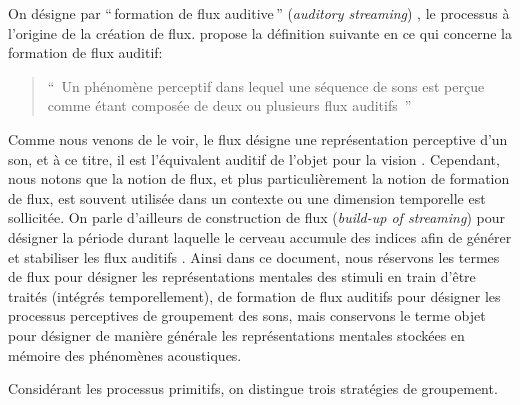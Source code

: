 On désigne par ``\,formation de flux auditive\,'' (\emph{auditory streaming}) , le processus à l'origine de la création de flux. \citep{winkler2009modeling} propose la définition suivante en ce qui concerne la formation de flux auditif:

\begin{quote}
``\, Un phénomène perceptif dans lequel une séquence de sons est perçue comme étant composée de deux ou plusieurs flux auditifs \,''
\end{quote}

Comme nous venons de le voir, le flux désigne une représentation perceptive d'un son, et à ce titre, il est l'équivalent auditif de l'objet pour la vision \citep[p. 11]{bregman1994auditory}. Cependant, nous notons que la notion de flux, et plus particulièrement la notion de formation de flux, est souvent utilisée dans un contexte ou une dimension temporelle est sollicitée. On parle d'ailleurs de construction de flux  (\emph{build-up of streaming}) pour désigner la période durant laquelle le cerveau accumule des indices afin de générer et stabiliser les flux auditifs  \citep{cusack2004effects,snyder2007toward}. Ainsi dans ce document, nous réservons les termes de flux pour désigner les représentations mentales des stimuli en train d'être traités (intégrés temporellement), de formation de flux auditifs pour désigner les processus perceptives de groupement des sons, mais conservons le terme objet pour désigner de manière générale les représentations mentales stockées en mémoire des phénomènes acoustiques.

Considérant les processus primitifs, on distingue trois stratégies de groupement.

